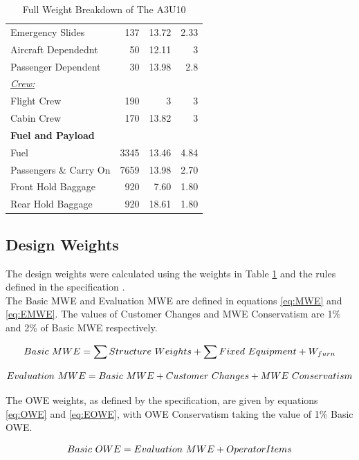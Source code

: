 \documentclass[11pt]{article}
\begin{document}
\begin{table}[p]
\begin{tabular}{lrrr}
Emergency Slides & 137 & 13.72 & 2.33\\
Aircraft Dependednt & 50 & 12.11 & 3 \\
Passenger Dependent & 30 & 13.98 & 2.8 \\
\underline{\textit{Crew:}}\\
Flight Crew & 190 & 3 & 3\\
Cabin Crew & 170 & 13.82 & 3\\
\textbf{Fuel and Payload}\\
Fuel & 3345 & 13.46 & 4.84\\
Passengers \& Carry On & 7659 & 13.98 & 2.70\\
Front Hold Baggage & 920 & 7.60 & 1.80\\
Rear Hold Baggage & 920 & 18.61 & 1.80\\

\bottomrule
\end{tabular}
\caption{Full Weight Breakdown of The A3U10}
\label{table:WXYZ}
\end{table}

\subsection{Design Weights}

The design weights were calculated using the weights in Table \ref{table:WXYZ} and the rules defined in the specification \cite{SPEC}. \\
The Basic MWE and Evaluation MWE are defined in equations \ref{eq:MWE} and \ref{eq:EMWE}. The values of Customer Changes and MWE Conservatism are 1\% and 2\% of Basic MWE respectively.

\begin{equation} \label{eq:MWE}
\centering
 Basic \ MWE = \sum{Structure \ Weights} + \sum{Fixed \ Equipment} + W_{furn}
\end{equation} 

\begin{equation} \label{eq:EMWE}
\centering
Evaluation \ MWE = Basic \ MWE + Customer \ Changes + MWE \ Conservatism
\end{equation}

The OWE weights, as defined by the specification, are given by equations \ref{eq:OWE} and \ref{eq:EOWE}, with OWE Conservatism taking the value of 1\% Basic OWE.

\begin{equation} \label{eq:OWE}
\centering
Basic \ OWE = Evaluation \ MWE + Operator Items 
\end{equation}
\end{document}
